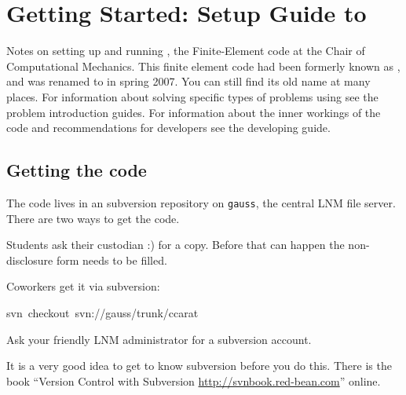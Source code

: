 
\makeatletter
\newenvironment{lyxcode}
{\begin{list}{}{
\setlength{\rightmargin}{\leftmargin}
\setlength{\listparindent}{0pt}%
\raggedright
\setlength{\itemsep}{0pt}
\setlength{\parsep}{0pt}
\normalfont\ttfamily}%
 \item[]}
{\end{list}}
\newenvironment{lyxlist}[1]
{\begin{list}{}
{\settowidth{\labelwidth}{#1}
 \setlength{\leftmargin}{\labelwidth}
 \addtolength{\leftmargin}{\labelsep}
 \renewcommand{\makelabel}[1]{##1\hfil}}}
{\end{list}}

\makeatother

\newcommand{\gauss}{{\tt gauss}}


\chapter{Getting Started: Setup Guide to \baci{}}


Notes on setting up and running \baci{}, the Finite-Element code
at the Chair of Computational Mechanics. This finite element code had been
formerly known as \ccarat{}, and was renamed to \baci{} in spring 2007. You
can still find its old name at many places.
For information about solving specific types of problems using \baci{}
see the problem introduction guides. For information about the inner
workings of the code and recommendations for developers see the developing
guide.


\section{Getting the code}

The \baci{} code lives in an subversion repository on \gauss{},
the central LNM file server. There are two ways to get the code.

\begin{itemize}
\item Students ask their custodian :) for a copy. Before that can happen
the non-disclosure form needs to be filled.
\item Coworkers get it via subversion:

\begin{lyxcode}
svn~checkout~svn://gauss/trunk/ccarat
\end{lyxcode}
Ask your friendly LNM administrator for a subversion account.

It is a very good idea to get to know subversion before you do this.
There is the book {}``Version Control with Subversion \url{http://svnbook.red-bean.com}''
online.

\end{itemize}

